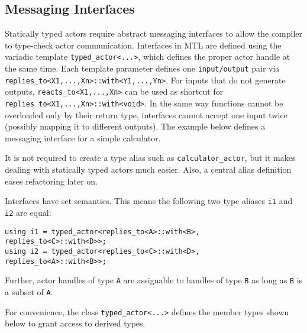 \clearpage
\subsection{Messaging Interfaces}
\label{interface}

Statically typed actors require abstract messaging interfaces to allow the
compiler to type-check actor communication. Interfaces in MTL are defined using
the variadic template \lstinline^typed_actor<...>^, which defines the proper
actor handle at the same time. Each template parameter defines one
\lstinline^input/output^ pair via
\lstinline^replies_to<X1,...,Xn>::with<Y1,...,Yn>^. For inputs that do not
generate outputs, \lstinline^reacts_to<X1,...,Xn>^ can be used as shortcut for
\lstinline^replies_to<X1,...,Xn>::with<void>^. In the same way functions cannot
be overloaded only by their return type, interfaces cannot accept one input
twice (possibly mapping it to different outputs). The example below defines a
messaging interface for a simple calculator.


It is not required to create a type alias such as \lstinline^calculator_actor^,
but it makes dealing with statically typed actors much easier. Also, a central
alias definition eases refactoring later on.

Interfaces have set semantics. This means the following two type aliases
\lstinline^i1^ and \lstinline^i2^ are equal:

\begin{lstlisting}
using i1 = typed_actor<replies_to<A>::with<B>, replies_to<C>::with<D>>;
using i2 = typed_actor<replies_to<C>::with<D>, replies_to<A>::with<B>>;
\end{lstlisting}

Further, actor handles of type \lstinline^A^ are assignable to handles of type
\lstinline^B^ as long as \lstinline^B^ is a subset of \lstinline^A^.

For convenience, the class \lstinline^typed_actor<...>^ defines the member
types shown below to grant access to derived types.

